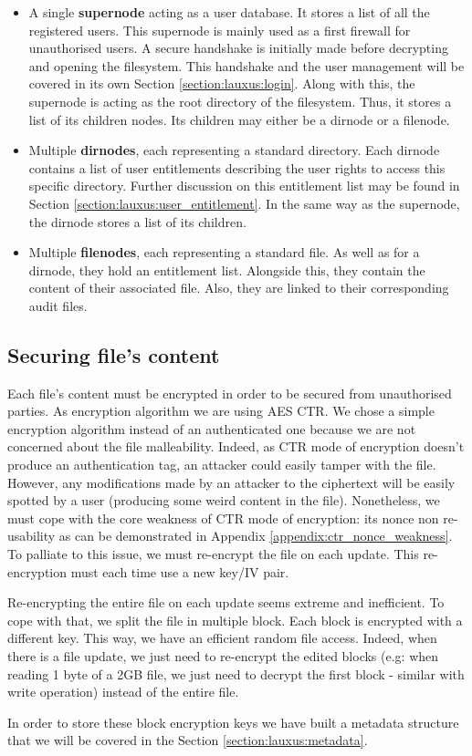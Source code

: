 \documentclass[../main.tex]{subfiles}
\begin{document}
\begin{itemize}
    \item A single \textbf{supernode} acting as a user database. It stores a list of all the registered users. This supernode is mainly used as a first firewall for unauthorised users. A secure handshake is initially made before decrypting and opening the filesystem. This handshake and the user management will be covered in its own Section \ref{section:lauxus:login}. Along with this, the supernode is acting as the root directory of the filesystem. Thus, it stores a list of its children nodes. Its children may either be a dirnode or a filenode.
    \item Multiple \textbf{dirnodes}, each representing a standard directory. Each dirnode contains a list of user entitlements describing the user rights to access this specific directory. Further discussion on this entitlement list may be found in Section \ref{section:lauxus:user_entitlement}. In the same way as the supernode, the dirnode stores a list of its children.
    \item Multiple \textbf{filenodes}, each representing a standard file. As well as for a dirnode, they hold an entitlement list. Alongside this, they contain the content of their associated file. Also, they are linked to their corresponding audit files.
\end{itemize}


\subsection{Securing file's content}
\label{section:lauxus:filesystem_encryption}

\par Each file's content must be encrypted in order to be secured from unauthorised parties. As encryption algorithm we are using AES CTR. We chose a simple encryption algorithm instead of an authenticated one because we are not concerned about the file malleability. Indeed, as CTR mode of encryption doesn't produce an authentication tag, an attacker could easily tamper with the file. However, any modifications made by an attacker to the ciphertext will be easily spotted by a user (producing some weird content in the file). Nonetheless, we must cope with the core weakness of CTR mode of encryption: its nonce non re-usability as can be demonstrated in Appendix \ref{appendix:ctr_nonce_weakness}. To palliate to this issue, we must re-encrypt the file on each update. This re-encryption must each time use a new key/IV pair.
\par Re-encrypting the entire file on each update seems extreme and inefficient. To cope with that, we split the file in multiple block. Each block is encrypted with a different key. This way, we have an efficient random file access. Indeed, when there is a file update, we just need to re-encrypt the edited blocks (e.g: when reading 1 byte of a 2GB file, we just need to decrypt the first block - similar with write operation) instead of the entire file.
\par In order to store these block encryption keys we have built a metadata structure that we will be covered in the Section \ref{section:lauxus:metadata}.
\end{document}
